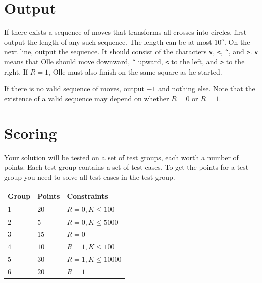 \section*{Output}
If there exists a sequence of moves that transforms all crosses into circles, first output the length of any such sequence.
The length can be at most $10^5$. On the next line, output the sequence. It should consist of the characters
\verb|v|, \verb|<|, \verb|^|, and \verb|>|.
\verb|v| means that Olle should move downward, \verb|^| upward, \verb|<| to the left, and \verb|>| to the right.
If $R=1$, Olle must also finish on the same square as he started.

If there is no valid sequence of moves, output $-1$ and nothing else. Note that the existence of a valid sequence may
depend on whether $R=0$ or $R=1$.

\section*{Scoring}
Your solution will be tested on a set of test groups, each worth a number of points. Each test group contains
a set of test cases. To get the points for a test group you need to solve all test cases in the test group.

\noindent
\begin{tabular}{| l | l | p{12cm} |}
  \hline
  \textbf{Group} & \textbf{Points} & \textbf{Constraints} \\ \hline
  $1$    & $20$       & $R=0, K \leq 100$ \\ \hline
  $2$    & $5$        & $R=0, K \leq 5000$ \\ \hline
  $3$    & $15$       & $R=0$ \\ \hline
  $4$    & $10$       & $R=1, K \leq 100$ \\ \hline
  $5$    & $30$       & $R=1, K \leq 10000$ \\ \hline
  $6$    & $20$       & $R=1$ \\ \hline
\end{tabular}

